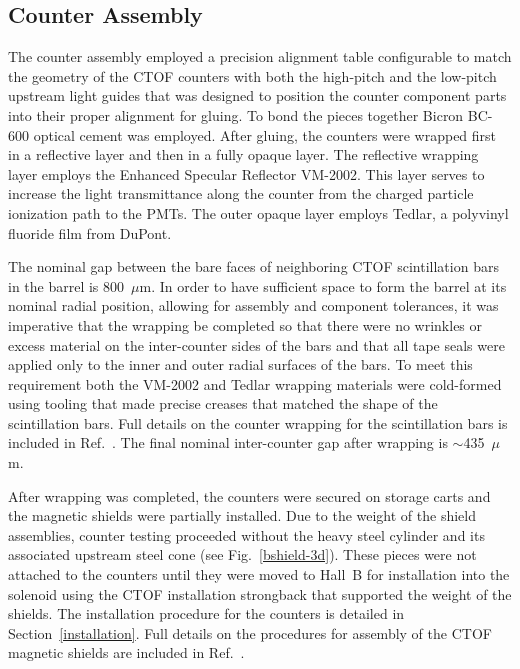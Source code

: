 \documentclass[3p,times,twocolumn]{elsarticle}
\begin{document}
\subsection{Counter Assembly}
\label{assembly}
           
The counter assembly employed a precision alignment table configurable to match the geometry of the CTOF
counters with both the high-pitch and the low-pitch upstream light guides that was designed to position the
counter component parts into their proper alignment for gluing. To bond the pieces together Bicron BC-600
optical cement was employed. After gluing, the counters were wrapped first in a reflective layer and then
in a fully opaque layer. The reflective wrapping layer employs the Enhanced Specular Reflector VM-2002. This
layer serves to increase the light transmittance along the counter from the charged particle ionization path to
the PMTs. The outer opaque layer employs Tedlar, a polyvinyl fluoride film from DuPont.

The nominal gap between the bare faces of neighboring CTOF scintillation bars in the barrel is 800~$\mu$m.
In order to have sufficient space to form the barrel at its nominal radial position, allowing for assembly and
component tolerances, it was imperative that the wrapping be completed so that there were no wrinkles or
excess material on the inter-counter sides of the bars and that all tape seals were applied only to the inner
and outer radial surfaces of the bars. To meet this requirement both the VM-2002 and Tedlar wrapping
materials were cold-formed using tooling that made precise creases that matched the shape of the scintillation
bars. Full details on the counter wrapping for the scintillation bars is included in Ref.~\cite{ctof-wrapping}. The
final nominal inter-counter gap after wrapping is $\sim$435~$\mu$m.

After wrapping was completed, the counters were secured on storage carts and the magnetic shields were
partially installed. Due to the weight of the shield assemblies, counter testing proceeded without the heavy
steel cylinder and its associated upstream steel cone (see Fig.~\ref{bshield-3d}). These pieces were not
attached to the counters until they were moved to Hall~B for installation into the solenoid using the CTOF
installation strongback that supported the weight of the shields. The installation procedure for the counters
is detailed in Section~\ref{installation}. Full details on the procedures for assembly of the CTOF magnetic
shields are included in Ref.~\cite{ctof-sh-assy}.
\end{document}
